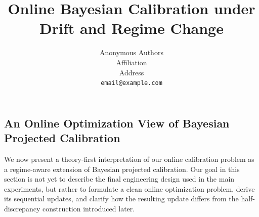 \documentclass{article}
\title{Online Bayesian Calibration under Drift and Regime Change}
\author{
  Anonymous Authors \\
  Affiliation \\
  Address \\
  \texttt{email@example.com} \\
}
\begin{document}
\subsection{An Online Optimization View of Bayesian Projected Calibration}
\label{sec:online_bpc}

We now present a theory-first interpretation of our online calibration problem as a regime-aware extension of Bayesian projected calibration. Our goal in this section is not yet to describe the final engineering design used in the main experiments, but rather to formulate a clean online optimization problem, derive its sequential updates, and clarify how the resulting update differs from the half-discrepancy construction introduced later.

\end{document}
